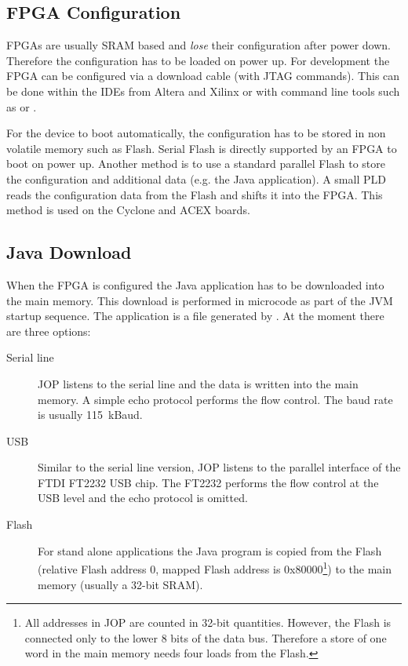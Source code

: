 \subsection{FPGA Configuration}

FPGAs are usually SRAM based and \emph{lose} their configuration
after power down. Therefore the configuration has to be loaded on
power up. For development the FPGA can be configured via a download
cable (with JTAG commands). This can be done within the IDEs from
Altera and Xilinx or with command line tools such as
 or .

For the device to boot automatically, the configuration has to be
stored in non volatile memory such as Flash. Serial Flash is directly
supported by an FPGA to boot on power up. Another method is to use a
standard parallel Flash to store the configuration and additional
data (e.g. the Java application). A small PLD reads the configuration
data from the Flash and shifts it into the FPGA. This method is used
on the Cyclone and ACEX boards.

\subsection{Java Download}

 When the FPGA is configured the Java
application has to be downloaded into the main memory. This download
is performed in microcode as part of the JVM startup sequence. The
application is a  file generated by . At the
moment there are three options:

\begin{description}
    \item[Serial line] JOP listens to the serial line and the
        data is written into the main memory. A simple echo
        protocol performs the flow control. The baud rate is
        usually 115~kBaud.
    \item[USB] Similar to the serial line version, JOP listens to
        the parallel interface of the FTDI FT2232 USB chip. The
        FT2232 performs the flow control at the USB level and the
        echo protocol is omitted.
    \item[Flash] For stand alone applications the Java program is
    copied from the Flash (relative Flash address 0, mapped Flash
    address is 0x80000\footnote{All addresses in JOP are counted in
    32-bit quantities. However, the Flash is connected only to the
    lower 8 bits of the data bus. Therefore a store of one word in
    the main memory needs four loads from the Flash.}) to the main
    memory (usually a 32-bit SRAM).
\end{description}


